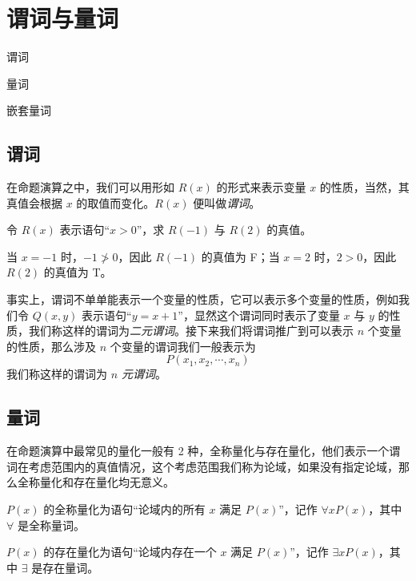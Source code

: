 \section{谓词与量词}
\begin{introduction}
    \item 谓词
    \item 量词
    \item 嵌套量词
\end{introduction}

\subsection{谓词}
在命题演算之中，我们可以用形如 $R(x)$ 的形式来表示变量 $x$ 的性质，当然，其真值会根据 $x$ 的取值而变化。$R(x)$ 便叫做\emph{谓词}。
\begin{collections}
    \begin{example}
        令 $R(x)$ 表示语句“$x > 0$”，求 $R(-1)$ 与 $R(2)$ 的真值。
    \end{example}
    \begin{solution}
        当 $x = -1$ 时，$-1 \ngtr 0$，因此 $R(-1)$ 的真值为 F；当 $x = 2$ 时，$2 > 0$，因此 $R(2)$ 的真值为 T。
    \end{solution}
\end{collections}

事实上，谓词不单单能表示一个变量的性质，它可以表示多个变量的性质，例如我们令 $Q(x,y)$ 表示语句“$y = x + 1$”，显然这个谓词同时表示了变量 $x$ 与 $y$ 的性质，我们称这样的谓词为\emph{二元谓词}。接下来我们将谓词推广到可以表示 $n$ 个变量的性质，那么涉及 $n$ 个变量的谓词我们一般表示为
\begin{equation*}
    P(x_1,x_2,\cdots,x_n)
\end{equation*}
我们称这样的谓词为 \emph{$n$ 元谓词}。

\subsection{量词}
在命题演算中最常见的量化一般有 2 种，全称量化与存在量化，他们表示一个谓词在考虑范围内的真值情况，这个考虑范围我们称为论域，如果没有指定论域，那么全称量化和存在量化均无意义。

\begin{definition}[全称量化]\label{def:全称量化}
    $P(x)$ 的全称量化为语句“论域内的所有 $x$ 满足 $P(x)$”，记作 $\forall x P(x)$，其中 $\forall$ 是全称量词。
\end{definition}

\begin{definition}[存在量化]\label{def:存在量化}
    $P(x)$ 的存在量化为语句“论域内存在一个 $x$ 满足 $P(x)$”，记作 $\exists x P(x)$，其中 $\exists$ 是存在量词。
\end{definition}

